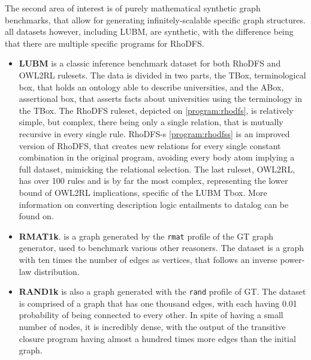 \documentclass[sigconf,screen,review,natbib]{acmart}
\theoremstyle{definition}
\begin{document}
The second area of interest is of purely mathematical synthetic graph benchmarks, that allow for generating infinitely-scalable specific graph structures. all datasets however,
including LUBM\cite{lubm}, are synthetic, with the difference being that there are multiple specific programs for RhoDFS.
\begin{itemize}
	\item \textbf{LUBM} is a classic inference benchmark dataset for both RhoDFS and OWL2RL rulesets. The data is divided in two parts, the TBox, terminological box, that holds
	      an ontology able to describe universities, and the ABox, assertional box, that asserts facts about universities using the terminology in the TBox. The RhoDFS ruleset, depicted
	      on \ref{program:rhodfs}, is relatively simple, but complex, there being only a single relation, that is mutually recursive in every single rule. RhoDFS-s \ref{program:rhodfss} is an improved version of RhoDFS,
	      that creates new relations for every single constant combination in the original program, avoiding every body atom implying a full dataset, mimicking the relational selection. The
	      last ruleset, OWL2RL, has over 100 rules and is by far the most complex, representing the lower bound of OWL2RL implications, specific of the LUBM Tbox. More information on converting
	      description logic entailments to datalog can be found on\cite{descr_to_dlog}.
	\item \textbf{RMAT1k}. is a graph generated by the \verb|rmat| profile of the GT\cite{gtgraph} graph generator, used to benchmark various other reasoners\cite{recstep}\cite{bigdatalog}.
	      The dataset is a graph with ten times the number of edges as vertices, that follows an inverse power-law distribution.
	\item \textbf{RAND1k} is also a graph generated with the \verb|rand| profile of GT. The dataset is comprised of a graph that has one thousand edges, with each
	      having 0.01 probability of being connected to every other. In spite of having a small number of nodes, it is incredibly dense, with the output of the transitive closure program having almost
	      a hundred times more edges than the initial graph.
\end{itemize}
\end{document}
